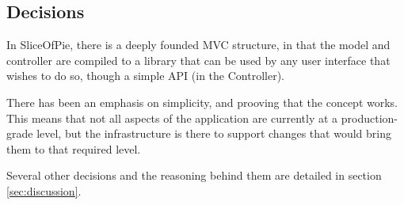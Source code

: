 \subsection{Decisions}

In SliceOfPie, there is a deeply founded MVC structure, in that the model and controller are
compiled to a library that can be used by any user interface that wishes to do so, though a
simple API (in the Controller).

There has been an emphasis on simplicity, and prooving that the concept works. This means that
not all aspects of the application are currently at a production-grade level, but the infrastructure
is there to support changes that would bring them to that required level.

Several other decisions and the reasoning behind them are detailed in section \ref{sec:discussion}.